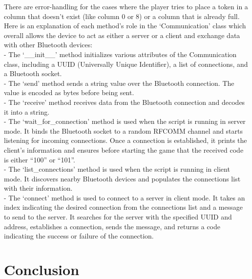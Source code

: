 \documentclass[12pt, a4paper, oneside]{report}
\begin{document}
	There are error-handling for the cases where the player tries to place a token in a column that doesn’t exist (like column 0 or 8) or a column that is already full. \\

	Here is an explanation of each method’s role in the `Communication' class which overall allows the device to act as either a server or a client and exchange data with other Bluetooth devices: \\

	- The `\_\_init\_\_' method initializes various attributes of the Communication class, including a UUID (Universally Unique Identifier), a list of connections, and a Bluetooth socket. \\

	- The `send' method sends a string value over the Bluetooth connection. The value is encoded as bytes before being sent. \\

	- The `receive' method receives data from the Bluetooth connection and decodes it into a string. \\

	- The `wait\_for\_connection' method is used when the script is running in server mode. It binds the Bluetooth socket to a random RFCOMM channel and starts listening for incoming connections. Once a connection is established, it prints the client's information and ensures before starting the game that the received code is either “100” or “101”. \\

	- The `list\_connections' method is used when the script is running in client mode. It discovers nearby Bluetooth devices and populates the connections list with their information. \\

	- The `connect' method is used to connect to a server in client mode. It takes an index indicating the desired connection from the connections list and a message to send to the server. It searches for the server with the specified UUID and address, establishes a connection, sends the message, and returns a code indicating the success or failure of the connection. \\
	
	\chapter{Conclusion}
\end{document}
